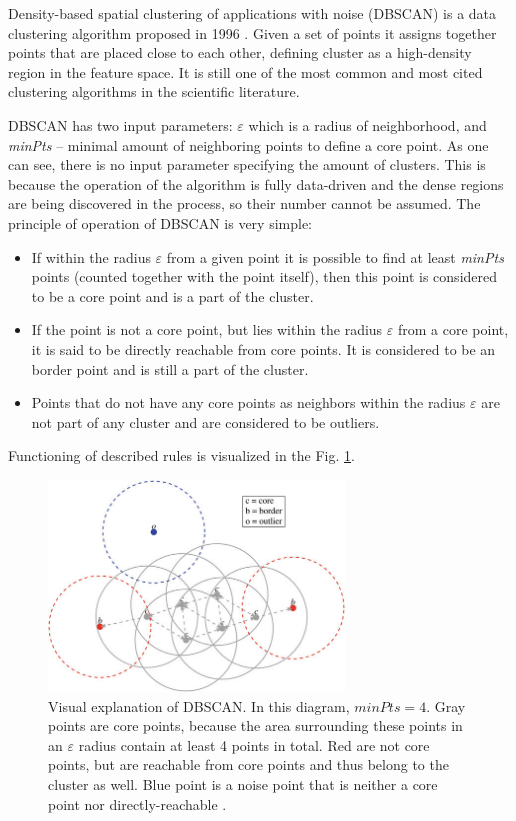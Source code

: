 \documentclass[3p,times]{elsarticle}
\begin{document}
Density-based spatial clustering of applications with noise (DBSCAN) is a data clustering algorithm proposed in 1996 \cite{ester1996density}. Given a set of points it assigns together points that are placed close to each other, defining cluster as a high-density region in the feature space. It is still one of the most common and most cited clustering algorithms in the scientific literature.


DBSCAN has two input parameters: $\varepsilon$ which is a radius of neighborhood, and \emph{minPts} -- minimal amount of neighboring points to define a core point. As one can see, there is no input parameter specifying the amount of clusters. This is because the operation of the algorithm is fully data-driven and the dense regions are being discovered in the process, so their number cannot be assumed.
The principle of operation of DBSCAN is very simple: 

\begin{itemize}
  \item If within the radius $\varepsilon$ from a given point it is possible to find at least \emph{minPts} points (counted together with the point itself), then this point is considered to be a core point and is a part of the cluster. 
  \item If the point is not a core point, but lies within the radius $\varepsilon$ from a core point, it is said to be directly reachable from core points. It is considered to be an border point and is still a part of the cluster.
  \item Points that do not have any core points as neighbors within the radius $\varepsilon$ are not part of any cluster and are considered to be outliers.
\end{itemize}

Functioning of described rules is visualized in the Fig. \ref{fig:db}.

\begin{figure}[ht!]
\centering
\includegraphics[width=0.7\textwidth]{figs/db1.jpg}
\caption{Visual explanation of DBSCAN. In this diagram, $minPts = 4$. Gray points are core points, because the area surrounding these points in an $\varepsilon$ radius contain at least 4 points in total. Red are not core points, but are reachable from core points and thus belong to the cluster as well. Blue point is a noise point that is neither a core point nor directly-reachable \cite{izzo2016designing}.}
\label{fig:db}
\end{figure}
\end{document}
